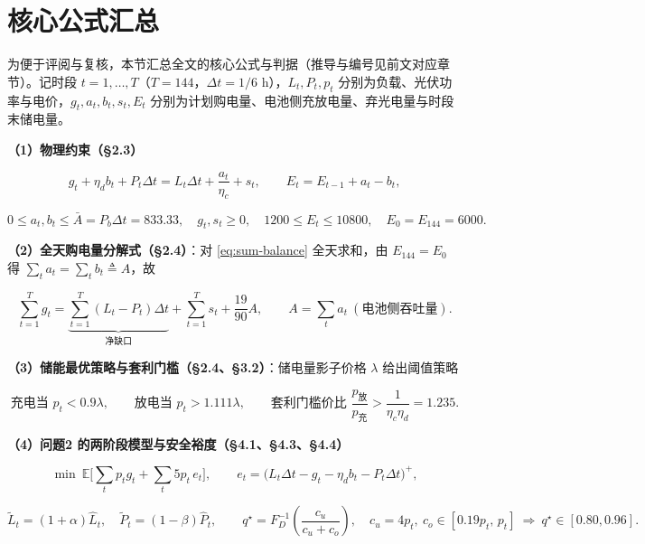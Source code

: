 \section{核心公式汇总}
\begingroup\small

为便于评阅与复核，本节汇总全文的核心公式与判据（推导与编号见前文对应章节）。记时段 $t=1,\dots,T$（$T=144$，$\Delta t=1/6$ \si{h}），$L_t,P_t,p_t$ 分别为负载、光伏功率与电价，$g_t,a_t,b_t,s_t,E_t$ 分别为计划购电量、电池侧充放电量、弃光电量与时段末储电量。

\textbf{（1）物理约束（\S2.3）}

\begin{equation}
  g_t+\eta_db_t+P_t\Delta t=L_t\Delta t+\frac{a_t}{\eta_c}+s_t,\qquad
  E_t=E_{t-1}+a_t-b_t,
  \label{eq:sum-balance}
\end{equation}

\begin{equation}
  0\le a_t,b_t\le\bar A=P_b\Delta t=833.33,\quad g_t,s_t\ge0,\quad
  1200\le E_t\le10800,\quad E_0=E_{144}=6000 .
  \label{eq:sum-bounds}
\end{equation}

\textbf{（2）全天购电量分解式（\S2.4）}：对 \cref{eq:sum-balance} 全天求和，由 $E_{144}=E_0$ 得 $\sum_ta_t=\sum_tb_t\triangleq A$，故

\begin{equation}
  \sum_{t=1}^{T}g_t=\underbrace{\sum_{t=1}^{T}(L_t-P_t)\Delta t}_{\text{净缺口}}+\sum_{t=1}^{T}s_t+\frac{19}{90}A,\qquad A=\sum_t a_t\ (\text{电池侧吞吐量}).
  \label{eq:sum-identity}
\end{equation}

\textbf{（3）储能最优策略与套利门槛（\S2.4、\S3.2）}：储电量影子价格 $\lambda$ 给出阈值策略

\begin{equation}
  \text{充电当 }p_t<0.9\lambda,\qquad \text{放电当 }p_t>1.111\lambda,\qquad
  \text{套利门槛价比 }\frac{p_{\text{放}}}{p_{\text{充}}}>\frac{1}{\eta_c\eta_d}=1.235 .
  \label{eq:sum-threshold}
\end{equation}

\textbf{（4）问题2 的两阶段模型与安全裕度（\S4.1、\S4.3、\S4.4）}

\begin{equation}
  \min\ \mathbb{E}\Big[\sum_tp_tg_t+\sum_t5p_t\,e_t\Big],\qquad
  e_t=\big(L_t\Delta t-g_t-\eta_db_t-P_t\Delta t\big)^{+},
  \label{eq:sum-p2cost}
\end{equation}

\begin{equation}
  \tilde L_t=(1+\alpha)\hat L_t,\quad \tilde P_t=(1-\beta)\hat P_t,\qquad
  q^\star=F_D^{-1}\!\left(\frac{c_u}{c_u+c_o}\right),\quad
  c_u=4p_t,\ c_o\in[0.19p_t,\,p_t]\ \Rightarrow\ q^\star\in[0.80,0.96].
  \label{eq:sum-margin}
\end{equation}

